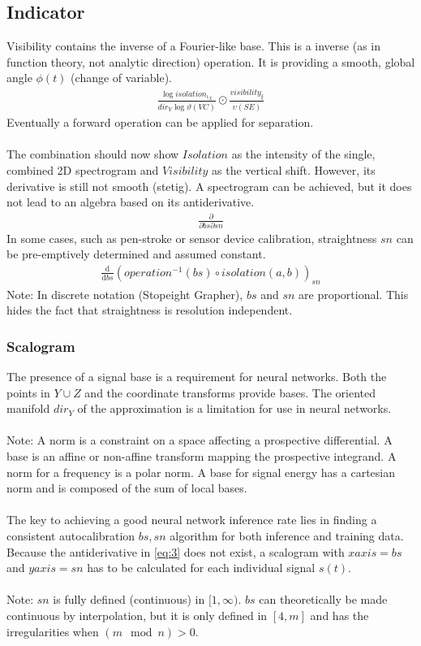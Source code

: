 \documentclass{report}
\begin{document}
\subsection{Indicator}
Visibility contains the inverse of a Fourier-like base. This is a inverse (as in function theory, not analytic direction) operation. It is providing a smooth, global angle $\phi(t)$ (change of variable).
\begin{align}
\frac{\log isolation_{\iota_{X}}}{dir_{Y}\log\overline{\vartheta (VC)}} \odot \frac{visibility_{\xi}}{\overline{\upsilon (SE)}}
\end{align}
Eventually a forward operation can be applied for separation.\\\\
The combination should now show $Isolation$ as the intensity of the single, combined 2D spectrogram and $Visibility$ as the vertical shift. However, its derivative is still not smooth (stetig). A spectrogram can be achieved, but it does not lead to an algebra based on its antiderivative.
\begin{align}
\frac{\partial}{\partial bs\partial sn}\label{eq:3}
\end{align}
In some cases, such as pen-stroke or sensor device calibration, straightness $sn$ can be pre-emptively determined and assumed constant.
\begin{align}
\frac{\mathrm{d}}{\mathrm{d} bs} (operation^{-1}(bs) \circ isolation(a,b))_{sn}
\end{align}
Note: In discrete notation (Stopeight Grapher), $bs$ and $sn$ are proportional. This hides the fact that straightness is resolution independent.

\subsubsection{Scalogram}
The presence of a signal base is a requirement for neural networks. Both the points in $Y\cup Z$ and the coordinate transforms provide bases. The oriented manifold $dir_{Y}$ of the approximation is a limitation for use in neural networks.\\\\
Note: A norm is a constraint on a space affecting a prospective differential. A base is an affine or non-affine transform mapping the prospective integrand. A norm for a frequency is a polar norm. A base for signal energy has a cartesian norm and is composed of the sum of local bases.\\\\
The key to achieving a good neural network inference rate lies in finding a consistent autocalibration $bs,sn$ algorithm for both inference and training data. Because the antiderivative in \eqref{eq:3} does not exist, a scalogram with $xaxis=bs$ and $yaxis=sn$ has to be calculated for each individual signal $s(t)$.\\\\
Note: $sn$ is fully defined (continuous) in $[1,\infty)$. $bs$ can theoretically be made continuous by interpolation, but it is only defined in $[4,m]$ and has the irregularities when $(m\mod n) > 0$.
\end{document}
